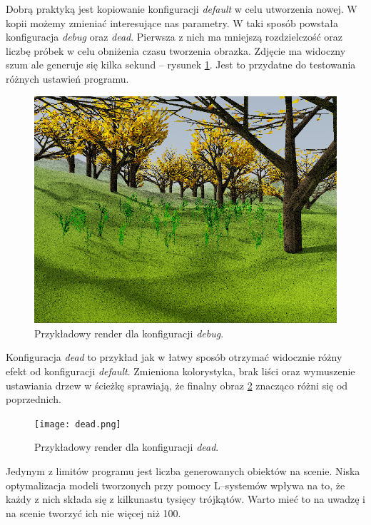 \documentclass[inz,shortabstract]{iithesis}
\begin{document}
        Dobrą praktyką jest kopiowanie konfiguracji \textit{default} w celu utworzenia nowej. W kopii możemy zmieniać interesujące nas parametry. W taki sposób powstała konfiguracja \textit{debug} oraz \textit{dead}. Pierwsza z nich ma mniejszą rozdzielczość oraz liczbę próbek w celu obniżenia czasu tworzenia obrazka. Zdjęcie ma widoczny szum ale generuje się kilka sekund -- rysunek \ref{fig:debug}. Jest to przydatne do testowania różnych ustawień programu.
        \begin{figure}[h] 
            \includegraphics[width=\linewidth]{debug.png}
            \caption{Przykładowy render dla konfiguracji \textit{debug}.} 
            \label{fig:debug}
        \end{figure}
       
        Konfiguracja \textit{dead} to przykład jak w łatwy sposób otrzymać widocznie różny efekt od konfiguracji \textit{default}. Zmieniona kolorystyka, brak liści oraz wymuszenie ustawiania drzew w ścieżkę sprawiają, że finalny obraz \ref{fig:dead} znacząco różni się od poprzednich.
        \begin{figure}[H] 
            \texttt{[image: dead.png]}
            \caption{Przykładowy render dla konfiguracji \textit{dead}.} 
            \label{fig:dead}
        \end{figure}
        \newpage
        
        Jedynym z limitów programu jest liczba generowanych obiektów na scenie. Niska optymalizacja modeli tworzonych przy pomocy L--systemów wpływa na to, że każdy z nich składa się z kilkunastu tysięcy trójkątów. Warto mieć to na uwadzę i na scenie tworzyć ich nie więcej niż 100. 
        
\end{document}
